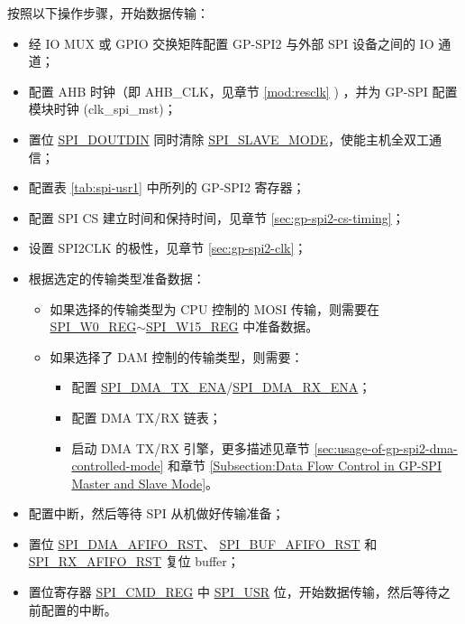 \documentclass[main\_\_CN.tex]{subfiles}
\begin{document}
按照以下操作步骤，开始数据传输：
\begin{itemize}
    \item 经 IO MUX 或 GPIO 交换矩阵配置 GP-SPI2 与外部 SPI 设备之间的 IO 通道； 
    \item 配置 AHB 时钟（即 AHB\_CLK，见章节 \ref{mod:resclk} \textit{}) ，并为 GP-SPI 配置模块时钟 (clk\_spi\_mst)；
    \item 置位 \hyperref[fielddesc:SPIDOUTDIN]{SPI\_DOUTDIN} 同时清除 \hyperref[fielddesc:SPISLAVEMODE]{SPI\_SLAVE\_MODE}，使能主机全双工通信；
    
    \item 配置表 \ref{tab:spi-usr1} 中所列的 GP-SPI2 寄存器；
    
    \item 配置 SPI CS 建立时间和保持时间，见章节 \ref{sec:gp-spi2-cs-timing}；
    
    \item 设置 SPI2CLK 的极性，见章节 \ref{sec:gp-spi2-clk}；
    
    \item 根据选定的传输类型准备数据：
    \begin{itemize}
        \item 如果选择的传输类型为 CPU 控制的 MOSI 传输，则需要在 \hyperref[regdesc:SPIW0REG]{SPI\_W0\_REG}$\sim$\hyperref[regdesc:SPIW15REG]{SPI\_W15\_REG} 中准备数据。 
        \item 如果选择了 DAM 控制的传输类型，则需要： 
        \begin{itemize}
            \item 配置 \hyperref[fielddesc:SPIDMATXENA]{SPI\_DMA\_TX\_ENA}/\hyperref[fielddesc:SPIDMARXENA]{SPI\_DMA\_RX\_ENA}；
            \item 配置 DMA TX/RX 链表；
            \item 启动 DMA TX/RX 引擎，更多描述见章节 \ref{sec:usage-of-gp-spi2-dma-controlled-mode} 和章节 \ref{Subsection:Data Flow Control in GP-SPI Master and Slave Mode}。
        \end{itemize}
    \end{itemize}
    
    \item 配置中断，然后等待 SPI 从机做好传输准备；
    
    \item 置位 \hyperref[fielddesc:SPIDMAAFIFORST]{SPI\_DMA\_AFIFO\_RST}、 \hyperref[fielddesc:SPIBUFAFIFORST]{SPI\_BUF\_AFIFO\_RST} 和 \hyperref[fielddesc:SPIRXAFIFORST]{SPI\_RX\_AFIFO\_RST} 复位 buffer；

    \item 置位寄存器 \hyperref[regdesc:SPICMDREG]{SPI\_CMD\_REG} 中 \hyperref[fielddesc:SPIUSR]{SPI\_USR} 位，开始数据传输，然后等待之前配置的中断。

\end{itemize}
\end{document}
